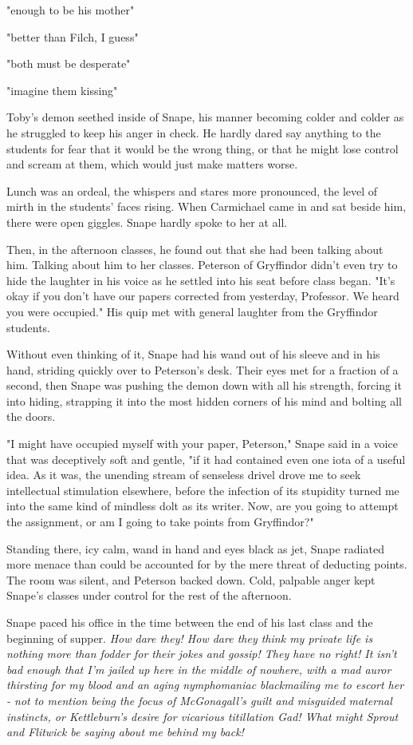 "{\el}enough to be his mother{\el}"

"{\el}better than Filch, I guess{\el}"

"{\el}both must be desperate{\el}"

"{\el}imagine them kissing{\el}"

Toby's demon seethed inside of Snape, his manner becoming colder and colder as he struggled to keep his anger in check. He hardly dared say anything to the students for fear that it would be the wrong thing, or that he might lose control and scream at them, which would just make matters worse.

Lunch was an ordeal, the whispers and stares more pronounced, the level of mirth in the students' faces rising. When Carmichael came in and sat beside him, there were open giggles. Snape hardly spoke to her at all.

Then, in the afternoon classes, he found out that she had been talking about him. Talking about him to her classes. Peterson of Gryffindor didn't even try to hide the laughter in his voice as he settled into his seat before class began. "It's okay if you don't have our papers corrected from yesterday, Professor. We heard you were{\el} occupied." His quip met with general laughter from the Gryffindor students.

Without even thinking of it, Snape had his wand out of his sleeve and in his hand, striding quickly over to Peterson's desk. Their eyes met for a fraction of a second, then Snape was pushing the demon down with all his strength, forcing it into hiding, strapping it into the most hidden corners of his mind and bolting all the doors.

"I might have occupied myself with your paper, Peterson," Snape said in a voice that was deceptively soft and gentle, "if it had contained even one iota of a useful idea. As it was, the unending stream of senseless drivel drove me to seek intellectual stimulation elsewhere, before the infection of its stupidity turned me into the same kind of mindless dolt as its writer. Now, are you going to attempt the assignment, or am I going to take points from Gryffindor?"

Standing there, icy calm, wand in hand and eyes black as jet, Snape radiated more menace than could be accounted for by the mere threat of deducting points. The room was silent, and Peterson backed down. Cold, palpable anger kept Snape's classes under control for the rest of the afternoon.

Snape paced his office in the time between the end of his last class and the beginning of supper. \emph{How dare they! How dare they think my private life is nothing more than fodder for their jokes and gossip! They have no right! It isn't bad enough that I'm jailed up here in the middle of nowhere, with a mad auror thirsting for my blood and an aging nymphomaniac blackmailing me to escort her - not to mention being the focus of McGonagall's guilt and misguided maternal instincts, or Kettleburn's desire for vicarious titillation{\el} Gad! What might Sprout and Flitwick be saying about me behind my back!}

